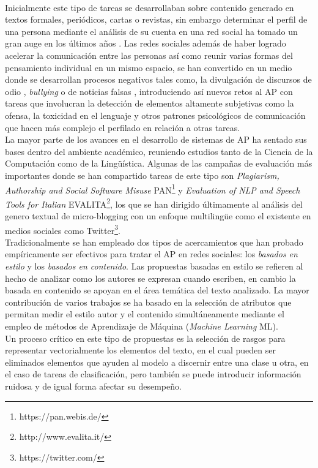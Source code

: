 \\
Inicialmente este tipo de tareas se desarrollaban sobre contenido generado en textos formales, periódicos, cartas o revistas, sin embargo determinar el perfil de una persona mediante el análisis de su cuenta en una red social ha tomado un gran auge en los últimos años \citep{rangel:2018,rangel:2019,f6032ffbacb14369b7a45d1ba9bd0b8c}.
 Las redes sociales además de haber logrado acelerar la comunicación entre las personas así como reunir varias formas del pensamiento individual en un mismo espacio, se han convertido en un medio donde se desarrollan procesos negativos tales como, la divulgación de discursos de odio \citep{rangel2021profiling}, \textit{bullying} o de noticias falsas \citep{rangel:2020}, introduciendo así nuevos retos al AP con tareas que involucran la detección de elementos altamente subjetivas como la ofensa, la toxicidad en el lenguaje y otros patrones psicológicos de comunicación que hacen más complejo el perfilado en relación a otras tareas.  
\\
 La mayor parte de los avances en el desarrollo de sistemas de AP ha sentado sus bases dentro del ambiente académico, reuniendo estudios tanto de la Ciencia de la Computación como de la Lingüística. Algunas de las campañas de evaluación más importantes donde se han compartido tareas de este tipo son \textit{Plagiarism, Authorship and Social Software Misuse} PAN\footnote{https://pan.webis.de/} y \textit{Evaluation of NLP and Speech Tools for Italian} EVALITA\footnote{http://www.evalita.it/}, los que se han dirigido últimamente al análisis del genero textual de micro-blogging  con un enfoque multilingüe como el existente en medios sociales como Twitter\footnote{https://twitter.com/}.
\\
Tradicionalmente se han empleado dos tipos de acercamientos que han probado empíricamente ser efectivos para tratar el AP en redes sociales: los \textit{basados en estilo}  y los \textit{basados en contenido}. Las propuestas basadas en estilo se refieren al hecho de analizar como los autores se expresan cuando escriben, en cambio la basada en contenido se apoyan en el área temática del texto analizado. La mayor contribución de varios trabajos se ha basado en la selección de atributos que permitan medir el estilo autor y el contenido simultáneamente mediante el empleo de métodos de Aprendizaje de Máquina (\textit{Machine Learning} ML).
\\
Un proceso crítico en este tipo de propuestas es la selección de rasgos para representar vectorialmente los elementos del texto,  en el cual pueden ser eliminados elementos que ayuden al modelo a discernir entre una clase u otra, en el caso de tareas de clasificación, pero también se puede introducir información ruidosa y de igual forma afectar su desempeño. 
